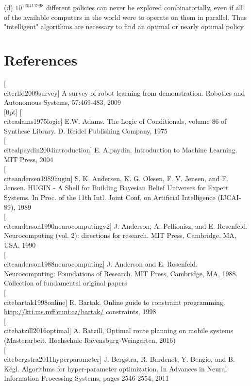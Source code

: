 \documentclass[10pt]{book}
\begin{document}
(d) $10^{120411998}$ different policies can never be explored combinatorially, even if all of the available computers in the world were to operate on them in parallel. Thus "intelligent" algorithms are necessary to find an optimal or nearly optimal policy.

\section*{References}
[\\cite{rlfd2009survey}] A survey of robot learning from demonstration. Robotics and Autonomous Systems, 57:469-483, 2009\\
[0pt]
[\\cite{adams1975logic}] E.W. Adams. The Logic of Conditionals, volume 86 of Synthese Library. D. Reidel Publishing Company, 1975\\[0pt]
[\\cite{alpaydin2004introduction}] E. Alpaydin. Introduction to Machine Learning. MIT Press, 2004\\[0pt]
[\\cite{andersen1989hugin}] S. K. Andersen, K. G. Olesen, F. V. Jensen, and F. Jensen. HUGIN - A Shell for Building Bayesian Belief Universes for Expert Systems. In Proc. of the 11th Intl. Joint Conf. on Artificial Intelligence (IJCAI-89), 1989\\[0pt]
[\\cite{anderson1990neurocomputingv2}] J. Anderson, A. Pellionisz, and E. Rosenfeld. Neurocomputing (vol. 2): directions for research. MIT Press, Cambridge, MA, USA, 1990\\[0pt]
[\\cite{anderson1988neurocomputing}] J. Anderson and E. Rosenfeld. Neurocomputing: Foundations of Research. MIT Press, Cambridge, MA, 1988. Collection of fundamental original papers\\[0pt]
[\\cite{bartak1998online}] R. Bartak. Online guide to constraint programming. \href{http://kti.ms.mff.cuni.cz/bartak/}{http://kti.ms.mff.cuni.cz/bartak/} constraints, 1998\\[0pt]
[\\cite{batzill2016optimal}] A. Batzill, Optimal route planning on mobile systems (Masterarbeit, Hochschule Ravensburg-Weingarten, 2016)\\[0pt]
[\\cite{bergstra2011hyperparameter}] J. Bergstra, R. Bardenet, Y. Bengio, and B. Kégl. Algorithms for hyper-parameter optimization. In Advances in Neural Information Processing Systems, pages 2546-2554, 2011\\[0pt]
\end{document}
